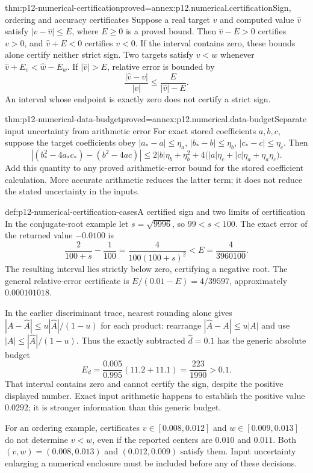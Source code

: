 \begin{hbtheorem}{thm:p12-numerical-certification}{proved=annex:p12.numerical.certification}{Sign, ordering and accuracy certificates}
Suppose a real target \(v\) and computed value \(\widehat v\) satisfy
\(|v-\widehat v|\leq E\), where \(E\geq0\) is a proved bound.
Then \(\widehat v-E>0\) certifies \(v>0\), and
\(\widehat v+E<0\) certifies \(v<0\). If the interval contains zero,
these bounds alone certify neither strict sign. Two targets satisfy
\(v<w\) whenever
\(\widehat v+E_v<\widehat w-E_w\).
If \(|\widehat v|>E\), relative error is bounded by
\[
 \frac{|\widehat v-v|}{|v|}\leq
 \frac{E}{|\widehat v|-E}.
\]
An interval whose endpoint is exactly zero does not certify a strict sign.
\end{hbtheorem}

\begin{hbtheorem}{thm:p12-numerical-data-budget}{proved=annex:p12.numerical.data-budget}{Separate input uncertainty from arithmetic error}
For exact stored coefficients \(a,b,c\), suppose the target coefficients
obey \(|a_*-a|\leq\eta_a\), \(|b_*-b|\leq\eta_b\),
\(|c_*-c|\leq\eta_c\). Then
\[
 |(b_*^2-4a_*c_*)-(b^2-4ac)|
 \leq 2|b|\eta_b+\eta_b^2
 +4\bigl(|a|\eta_c+|c|\eta_a+\eta_a\eta_c\bigr).
\]
Add this quantity to any proved arithmetic-error bound for the stored
coefficient calculation. More accurate arithmetic reduces the latter
term; it does not reduce the stated uncertainty in the inputs.
\end{hbtheorem}

\begin{hbexample}{def:p12-numerical-certification-cases}{A certified sign and two limits of certification}
In the conjugate-root example let \(s=\sqrt{9996}\), so
\(99<s<100\). The exact error of the returned value \(-0.0100\) is
\[
 \frac{2}{100+s}-\frac1{100}
 =\frac{4}{100(100+s)^2}
 <E=\frac{4}{3960100}.
\]
The resulting interval lies strictly below zero, certifying a negative
root. The general relative-error certificate is
\(E/(0.01-E)=4/39597\), approximately \(0.000101018\).

In the earlier discriminant trace, nearest rounding alone gives
\(|A-\widehat A|\leq u|\widehat A|/(1-u)\) for each product:
rearrange \(|\widehat A-A|\leq u|A|\) and use
\(|A|\leq|\widehat A|/(1-u)\). Thus the exactly subtracted
\(\widehat d=0.1\) has the generic absolute budget
\[
 E_d=\frac{0.005}{0.995}(11.2+11.1)=\frac{223}{1990}>0.1.
\]
That interval contains zero and cannot certify the sign, despite the
positive displayed number. Exact input arithmetic happens to establish
the positive value \(0.0292\); it is stronger information than this
generic budget.

For an ordering example, certificates \(v\in[0.008,0.012]\) and
\(w\in[0.009,0.013]\) do not determine \(v<w\), even if the
reported centers are \(0.010\) and \(0.011\). Both
\((v,w)=(0.008,0.013)\) and \((0.012,0.009)\) satisfy them.
Input uncertainty enlarging a numerical enclosure must be included
before any of these decisions.
\end{hbexample}


